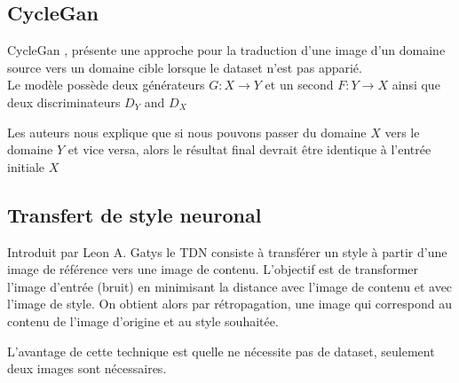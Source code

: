 \documentclass[a4paper, 12pt]{report}
\begin{document}
\subsection{CycleGan}
CycleGan \cite{CycleGAN2017}, présente une approche pour la traduction d'une image d'un domaine source vers un domaine cible lorsque le dataset n'est pas apparié. \\

Le modèle possède deux générateurs $G:X\to Y$ et un second $F:Y\to X$ ainsi que deux discriminateurs $D_Y$ and $D_X$

Les auteurs nous explique que si nous pouvons passer du domaine $X$ vers le domaine $Y$ et vice versa, alors le résultat final devrait être identique à l'entrée initiale $X$

\subsection{Transfert de style neuronal} 
Introduit par Leon A. Gatys \cite{DBLP:journals/corr/GatysEB15a} le TDN consiste à transférer un style à partir d'une image de référence vers une image de contenu. L'objectif est de transformer l'image d'entrée (bruit) en minimisant la distance avec l'image de contenu et avec l'image de style. On obtient alors par rétropagation, une image qui correspond au contenu de l'image d'origine et au style souhaitée.

L'avantage de cette technique est quelle ne nécessite pas de dataset, seulement deux images sont nécessaires.
\end{document}
